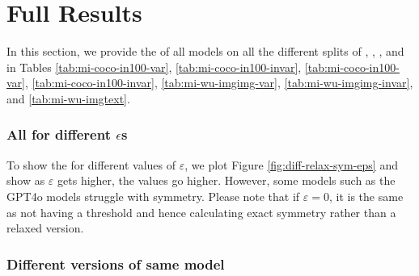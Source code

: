 \FloatBarrier
\section{Full Results}
\label{sec:full-results}

In this section, we provide the \nmi of all models on all the different splits of \mmscorecoco, \mmscorein, \mmscorewuimgimg, and \mmscorewuimgtext{} in Tables \ref{tab:mi-coco-in100-var}, \ref{tab:mi-coco-in100-invar}, \ref{tab:mi-coco-in100-var}, \ref{tab:mi-coco-in100-invar}, \ref{tab:mi-wu-imgimg-var}, \ref{tab:mi-wu-imgimg-invar}, and \ref{tab:mi-wu-imgtext}.









\subsubsection{All \relaxsym for different $\epsilon$s}
To show the \relaxsym{} for different values of $\varepsilon$, we plot Figure \ref{fig:diff-relax-sym-eps} and show as $\varepsilon$ gets higher, the values go higher. However, some models such as the GPT4o models struggle with symmetry. Please note that if $\varepsilon = 0$, it is the same as not having a threshold and hence calculating exact symmetry rather than a relaxed version.





\subsubsection{Different versions of same model}
\label{sec:model-versions}


